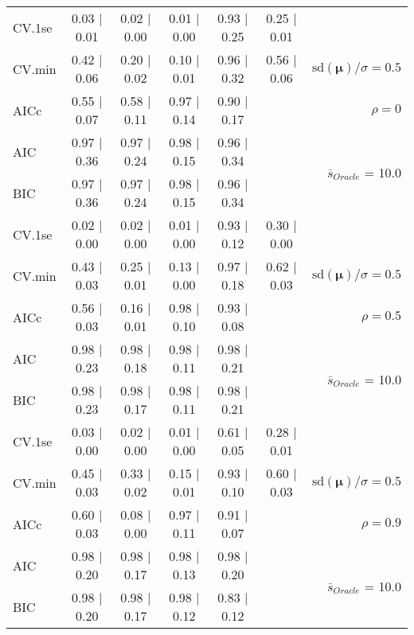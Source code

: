\begin{table}
\begin{center}
\begin{tabular}{l*{5}{c}|r}
 \hline 
CV.1se & 0.03 $\mid$ 0.01 & 0.02 $\mid$ 0.00 & 0.01 $\mid$ 0.00 & 0.93 $\mid$ 0.25 & 0.25 $\mid$ 0.01 & \\
CV.min & 0.42 $\mid$ 0.06 & 0.20 $\mid$ 0.02 & 0.10 $\mid$ 0.01 & 0.96 $\mid$ 0.32 & 0.56 $\mid$ 0.06 &  $\mathrm{sd}(\mathbf{\mu})/\sigma=0.5$ \\
AICc & 0.55 $\mid$ 0.07 & 0.58 $\mid$ 0.11 & 0.97 $\mid$ 0.14 & 0.90 $\mid$ 0.17 & & $\rho=0$ \\
AIC & 0.97 $\mid$ 0.36 & 0.97 $\mid$ 0.24 & 0.98 $\mid$ 0.15 & 0.96 $\mid$ 0.34 & &  \multirow{2}{*}{$\bar{s}_{Oracle}$ = 10.0} \\
BIC & 0.97 $\mid$ 0.36 & 0.97 $\mid$ 0.24 & 0.98 $\mid$ 0.15 & 0.96 $\mid$ 0.34 & &  \\
 \hline 
CV.1se & 0.02 $\mid$ 0.00 & 0.02 $\mid$ 0.00 & 0.01 $\mid$ 0.00 & 0.93 $\mid$ 0.12 & 0.30 $\mid$ 0.00 & \\
CV.min & 0.43 $\mid$ 0.03 & 0.25 $\mid$ 0.01 & 0.13 $\mid$ 0.00 & 0.97 $\mid$ 0.18 & 0.62 $\mid$ 0.03 &  $\mathrm{sd}(\mathbf{\mu})/\sigma=0.5$ \\
AICc & 0.56 $\mid$ 0.03 & 0.16 $\mid$ 0.01 & 0.98 $\mid$ 0.10 & 0.93 $\mid$ 0.08 & & $\rho=0.5$ \\
AIC & 0.98 $\mid$ 0.23 & 0.98 $\mid$ 0.18 & 0.98 $\mid$ 0.11 & 0.98 $\mid$ 0.21 & &  \multirow{2}{*}{$\bar{s}_{Oracle}$ = 10.0} \\
BIC & 0.98 $\mid$ 0.23 & 0.98 $\mid$ 0.17 & 0.98 $\mid$ 0.11 & 0.98 $\mid$ 0.21 & &  \\
 \hline 
CV.1se & 0.03 $\mid$ 0.00 & 0.02 $\mid$ 0.00 & 0.01 $\mid$ 0.00 & 0.61 $\mid$ 0.05 & 0.28 $\mid$ 0.01 & \\
CV.min & 0.45 $\mid$ 0.03 & 0.33 $\mid$ 0.02 & 0.15 $\mid$ 0.01 & 0.93 $\mid$ 0.10 & 0.60 $\mid$ 0.03 &  $\mathrm{sd}(\mathbf{\mu})/\sigma=0.5$ \\
AICc & 0.60 $\mid$ 0.03 & 0.08 $\mid$ 0.00 & 0.97 $\mid$ 0.11 & 0.91 $\mid$ 0.07 & & $\rho=0.9$ \\
AIC & 0.98 $\mid$ 0.20 & 0.98 $\mid$ 0.17 & 0.98 $\mid$ 0.13 & 0.98 $\mid$ 0.20 & &  \multirow{2}{*}{$\bar{s}_{Oracle}$ = 10.0} \\
BIC & 0.98 $\mid$ 0.20 & 0.98 $\mid$ 0.17 & 0.98 $\mid$ 0.12 & 0.83 $\mid$ 0.12 & &  \\
 \hline 
\end{tabular}
\end{center}
\vspace{-1cm}
\end{table}



